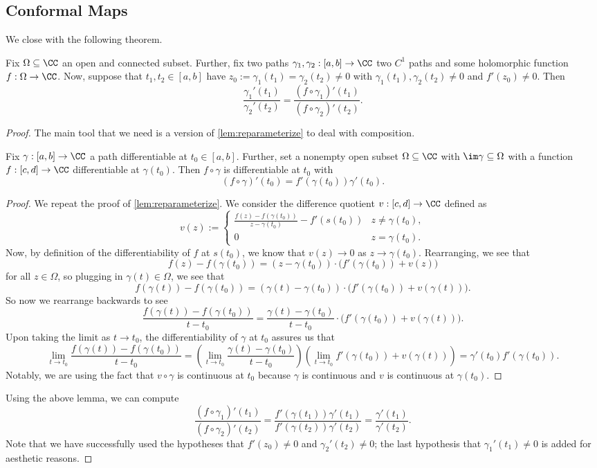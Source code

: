 \subsection{Conformal Maps}
We close with the following theorem.
\begin{theorem} \label{thm:getconformal}
	Fix $\Omega\subseteq\CC$ an open and connected subset. Further, fix two paths $\gamma_1,\gamma_2:[a,b]\to\CC$ two $C^1$ paths and some holomorphic function $f:\Omega\to\CC$. Now, suppose that $t_1,t_2\in[a,b]$ have $z_0:=\gamma_1(t_1)=\gamma_2(t_2)\ne0$ with $\gamma_1(t_1),\gamma_2(t_2)\ne0$ and $f'(z_0)\ne0$. Then
	\[\frac{\gamma_1'(t_1)}{\gamma_2'(t_2)}=\frac{(f\circ\gamma_1)'(t_1)}{(f\circ\gamma_2)'(t_2)}.\]
\end{theorem}
\begin{proof}
	The main tool that we need is a version of \autoref{lem:reparameterize} to deal with composition.
	\begin{lemma}
		Fix $\gamma:[a,b]\to\CC$ a path differentiable at $t_0\in[a,b]$. Further, set a nonempty open subset $\Omega\subseteq\CC$ with $\im\gamma\subseteq\Omega$ with a function $f:[c,d]\to\CC$ differentiable at $\gamma(t_0)$. Then $f\circ\gamma$ is differentiable at $t_0$ with
		\[(f\circ\gamma)'(t_0)=f'(\gamma(t_0))\gamma'(t_0).\]
	\end{lemma}
	\begin{proof}
		We repeat the proof of \autoref{lem:reparameterize}. We consider the difference quotient $v:[c,d]\to\CC$ defined as
		\[v(z):=\begin{cases}
			\frac{f(z)-f(\gamma(t_0))}{z-\gamma(t_0)}-f'(s(t_0)) & z\ne\gamma(t_0), \\
			0 & z=\gamma(t_0).
		\end{cases}\]
		Now, by definition of the differentiability of $f$ at $s(t_0)$, we know that $v(z)\to0$ as $z\to\gamma(t_0)$. Rearranging, we see that
		\[f(z)-f(\gamma(t_0))=(z-\gamma(t_0))\cdot\big(f'(\gamma(t_0))+v(z)\big)\]
		for all $z\in\Omega$, so plugging in $\gamma(t)\in\Omega$, we see that
		\[f(\gamma(t))-f(\gamma(t_0))=(\gamma(t)-\gamma(t_0))\cdot\big(f'(\gamma(t_0))+v(\gamma(t))\big).\]
		So now we rearrange backwards to see
		\[\frac{f(\gamma(t))-f(\gamma(t_0))}{t-t_0}=\frac{\gamma(t)-\gamma(t_0)}{t-t_0}\cdot\big(f'(\gamma(t_0))+v(\gamma(t))\big).\]
		Upon taking the limit as $t\to t_0$, the differentiability of $\gamma$ at $t_0$ assures us that
		\[\lim_{t\to t_0}\frac{f(\gamma(t))-f(\gamma(t_0))}{t-t_0}=\left(\lim_{t\to t_0}\frac{\gamma(t)-\gamma(t_0)}{t-t_0}\right)\left(\lim_{t\to t_0}f'(\gamma(t_0))+v(\gamma(t))\right)=\gamma'(t_0)f'(\gamma(t_0)).\]
		Notably, we are using the fact that $v\circ\gamma$ is continuous at $t_0$ because $\gamma$ is continuous and $v$ is continuous at $\gamma(t_0)$.
	\end{proof}
	Using the above lemma, we can compute
	\[\frac{(f\circ\gamma_1)'(t_1)}{(f\circ\gamma_2)'(t_2)}=\frac{f'(\gamma(t_1))\gamma'(t_1)}{f'(\gamma(t_2))\gamma'(t_2)}=\frac{\gamma'(t_1)}{\gamma'(t_2)}.\]
	Note that we have successfully used the hypotheses that $f'(z_0)\ne0$ and $\gamma_2'(t_2)\ne0$; the last hypothesis that $\gamma_1'(t_1)\ne0$ is added for aesthetic reasons.
\end{proof}
